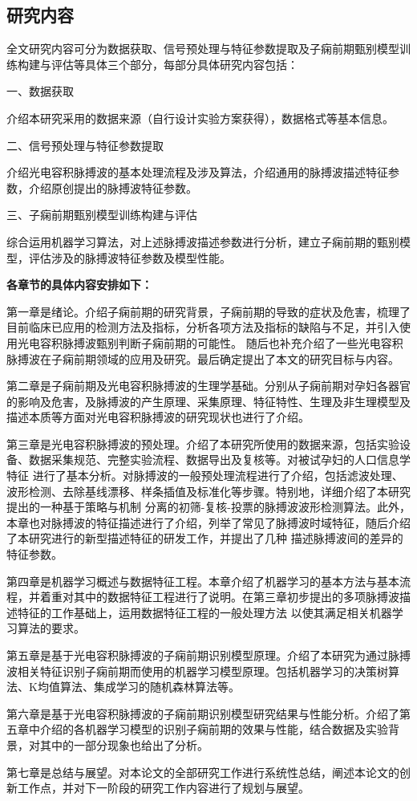 \subsection{研究内容}
全文研究内容可分为数据获取、信号预处理与特征参数提取及子痫前期甄别模型训练构建与评估等具体三个部分，每部分具体研究内容包括：

一、数据获取

介绍本研究采用的数据来源（自行设计实验方案获得），数据格式等基本信息。

二、信号预处理与特征参数提取

介绍光电容积脉搏波的基本处理流程及涉及算法，介绍通用的脉搏波描述特征参数，介绍原创提出的脉搏波特征参数。

三、子痫前期甄别模型训练构建与评估

综合运用机器学习算法，对上述脉搏波描述参数进行分析，建立子痫前期的甄别模型，评估涉及的脉搏波特征参数及模型性能。

\textbf{各章节的具体内容安排如下：}

第一章是绪论。介绍子痫前期的研究背景，子痫前期的导致的症状及危害，梳理了目前临床已应用的检测方法及指标，分析各项方法及指标的缺陷与不足，并引入使用光电容积脉搏波甄别判断子痫前期的可能性。
随后也补充介绍了一些光电容积脉搏波在子痫前期领域的应用及研究。最后确定提出了本文的研究目标与内容。

第二章是子痫前期及光电容积脉搏波的生理学基础。分别从子痫前期对孕妇各器官的影响及危害，及脉搏波的产生原理、采集原理、特征特性、生理及非生理模型及描述本质等方面对光电容积脉搏波的研究现状也进行了介绍。

第三章是光电容积脉搏波的预处理。介绍了本研究所使用的数据来源，包括实验设备、数据采集规范、完整实验流程、数据导出及复核等。对被试孕妇的人口信息学特征
进行了基本分析。对脉搏波的一般预处理流程进行了介绍，包括滤波处理、波形检测、去除基线漂移、样条插值及标准化等步骤。特别地，详细介绍了本研究提出的一种基于策略与机制
分离的初筛-复核-投票的脉搏波波形检测算法。此外，本章也对脉搏波的特征描述进行了介绍，列举了常见了脉搏波时域特征，随后介绍了本研究进行的新型描述特征的研发工作，并提出了几种
描述脉搏波间的差异的特征参数。

第四章是机器学习概述与数据特征工程。本章介绍了机器学习的基本方法与基本流程，并着重对其中的数据特征工程进行了说明。在第三章初步提出的多项脉搏波描述特征的工作基础上，运用数据特征工程的一般处理方法
以使其满足相关机器学习算法的要求。

第五章是基于光电容积脉搏波的子痫前期识别模型原理。介绍了本研究为通过脉搏波相关特征识别子痫前期而使用的机器学习模型原理。包括机器学习的决策树算法、K均值算法、集成学习的随机森林算法等。

第六章是基于光电容积脉搏波的子痫前期识别模型研究结果与性能分析。介绍了第五章中介绍的各机器学习模型的识别子痫前期的效果与性能，结合数据及实验背景，对其中的一部分现象也给出了分析。

第七章是总结与展望。对本论文的全部研究工作进行系统性总结，阐述本论文的创新工作点，并对下一阶段的研究工作内容进行了规划与展望。